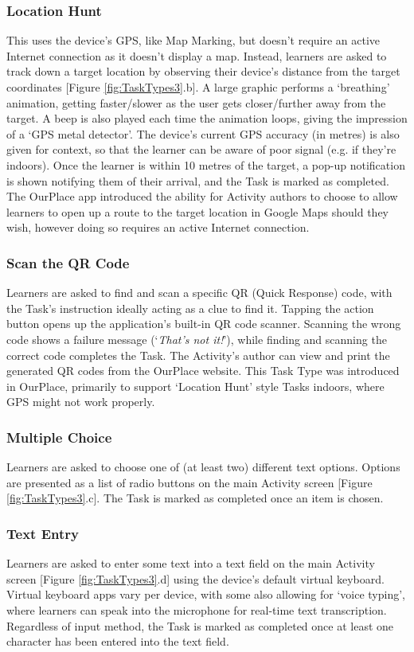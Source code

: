 \subsubsection*{Location Hunt}
This uses the device's GPS, like Map Marking, but doesn't require an active Internet connection as it doesn't display a map. Instead, learners are asked to track down a target location by observing their device's distance from the target coordinates [Figure \ref{fig:TaskTypes3}.b]. A large graphic performs a `breathing' animation, getting faster/slower as the user gets closer/further away from the target. A beep is also played each time the animation loops, giving the impression of a `GPS metal detector'. The device's current GPS accuracy (in metres) is also given for context, so that the learner can be aware of poor signal (e.g. if they're indoors). Once the learner is within 10 metres of the target, a pop-up notification is shown notifying them of their arrival, and the Task is marked as completed. The OurPlace app introduced the ability for Activity authors to choose to allow learners to open up a route to the target location in Google Maps should they wish, however doing so requires an active Internet connection.

\subsubsection*{Scan the QR Code}
Learners are asked to find and scan a specific QR (Quick Response) code, with the Task's instruction ideally acting as a clue to find it. Tapping the action button opens up the application's built-in QR code scanner. Scanning the wrong code shows a failure message (`\textit{That's not it!}'), while finding and scanning the correct code completes the Task. The Activity's author can view and print the generated QR codes from the OurPlace website. This Task Type was introduced in OurPlace, primarily to support `Location Hunt' style Tasks indoors, where GPS might not work properly.

\subsubsection*{Multiple Choice}
Learners are asked to choose one of (at least two) different text options. Options are presented as a list of radio buttons on the main Activity screen [Figure \ref{fig:TaskTypes3}.c]. The Task is marked as completed once an item is chosen.

\subsubsection*{Text Entry}
Learners are asked to enter some text into a text field on the main Activity screen [Figure \ref{fig:TaskTypes3}.d] using the device's default virtual keyboard. Virtual keyboard apps vary per device, with some also allowing for `voice typing', where learners can speak into the microphone for real-time text transcription. Regardless of input method, the Task is marked as completed once at least one character has been entered into the text field. 

